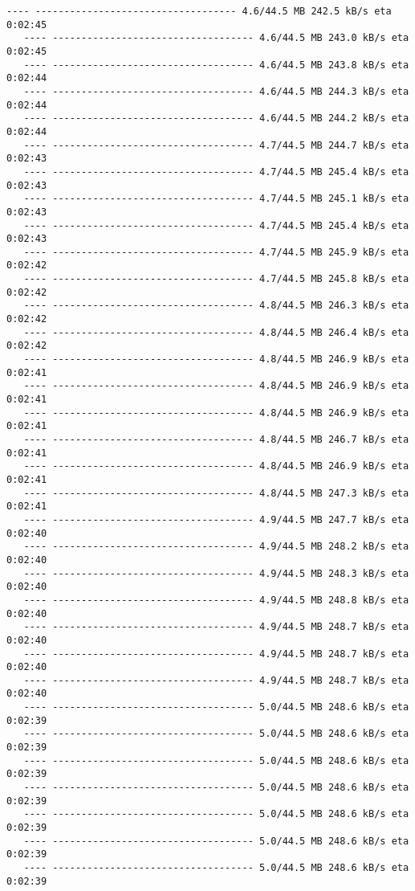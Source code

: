 \documentclass[11pt]{article}
\begin{document}
\begin{Verbatim}[commandchars=\\\{\}]
   ---- ----------------------------------- 4.6/44.5 MB 242.5 kB/s eta 0:02:45
   ---- ----------------------------------- 4.6/44.5 MB 243.0 kB/s eta 0:02:45
   ---- ----------------------------------- 4.6/44.5 MB 243.8 kB/s eta 0:02:44
   ---- ----------------------------------- 4.6/44.5 MB 244.3 kB/s eta 0:02:44
   ---- ----------------------------------- 4.6/44.5 MB 244.2 kB/s eta 0:02:44
   ---- ----------------------------------- 4.7/44.5 MB 244.7 kB/s eta 0:02:43
   ---- ----------------------------------- 4.7/44.5 MB 245.4 kB/s eta 0:02:43
   ---- ----------------------------------- 4.7/44.5 MB 245.1 kB/s eta 0:02:43
   ---- ----------------------------------- 4.7/44.5 MB 245.4 kB/s eta 0:02:43
   ---- ----------------------------------- 4.7/44.5 MB 245.9 kB/s eta 0:02:42
   ---- ----------------------------------- 4.7/44.5 MB 245.8 kB/s eta 0:02:42
   ---- ----------------------------------- 4.8/44.5 MB 246.3 kB/s eta 0:02:42
   ---- ----------------------------------- 4.8/44.5 MB 246.4 kB/s eta 0:02:42
   ---- ----------------------------------- 4.8/44.5 MB 246.9 kB/s eta 0:02:41
   ---- ----------------------------------- 4.8/44.5 MB 246.9 kB/s eta 0:02:41
   ---- ----------------------------------- 4.8/44.5 MB 246.9 kB/s eta 0:02:41
   ---- ----------------------------------- 4.8/44.5 MB 246.7 kB/s eta 0:02:41
   ---- ----------------------------------- 4.8/44.5 MB 246.9 kB/s eta 0:02:41
   ---- ----------------------------------- 4.8/44.5 MB 247.3 kB/s eta 0:02:41
   ---- ----------------------------------- 4.9/44.5 MB 247.7 kB/s eta 0:02:40
   ---- ----------------------------------- 4.9/44.5 MB 248.2 kB/s eta 0:02:40
   ---- ----------------------------------- 4.9/44.5 MB 248.3 kB/s eta 0:02:40
   ---- ----------------------------------- 4.9/44.5 MB 248.8 kB/s eta 0:02:40
   ---- ----------------------------------- 4.9/44.5 MB 248.7 kB/s eta 0:02:40
   ---- ----------------------------------- 4.9/44.5 MB 248.7 kB/s eta 0:02:40
   ---- ----------------------------------- 4.9/44.5 MB 248.7 kB/s eta 0:02:40
   ---- ----------------------------------- 5.0/44.5 MB 248.6 kB/s eta 0:02:39
   ---- ----------------------------------- 5.0/44.5 MB 248.6 kB/s eta 0:02:39
   ---- ----------------------------------- 5.0/44.5 MB 248.6 kB/s eta 0:02:39
   ---- ----------------------------------- 5.0/44.5 MB 248.6 kB/s eta 0:02:39
   ---- ----------------------------------- 5.0/44.5 MB 248.6 kB/s eta 0:02:39
   ---- ----------------------------------- 5.0/44.5 MB 248.6 kB/s eta 0:02:39
   ---- ----------------------------------- 5.0/44.5 MB 248.6 kB/s eta 0:02:39

\end{Verbatim}
\end{document}
